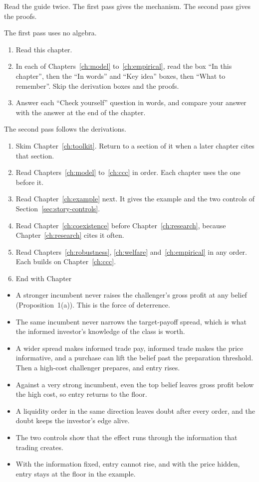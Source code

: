 Read the guide twice. The first pass gives the mechanism. The second pass gives the proofs.

The first pass uses no algebra.
\begin{enumerate}[nosep]
\item Read this chapter.
\item In each of Chapters~\ref{ch:model} to~\ref{ch:empirical}, read the box ``In this chapter'', then the ``In words'' and ``Key idea'' boxes, then ``What to remember''. Skip the derivation boxes and the proofs.
\item Answer each ``Check yourself'' question in words, and compare your answer with the answer at the end of the chapter.
\end{enumerate}

The second pass follows the derivations.
\begin{enumerate}[nosep]
\item Skim Chapter~\ref{ch:toolkit}. Return to a section of it when a later chapter cites that section.
\item Read Chapters~\ref{ch:model} to~\ref{ch:ccc} in order. Each chapter uses the one before it.
\item Read Chapter~\ref{ch:example} next. It gives the example and the two controls of Section~\ref{sec:story-controls}.
\item Read Chapter~\ref{ch:coexistence} before Chapter~\ref{ch:research}, because Chapter~\ref{ch:research} cites it often.
\item Read Chapters~\ref{ch:robustness}, \ref{ch:welfare} and~\ref{ch:empirical} in any order. Each builds on Chapter~\ref{ch:ccc}.
\item End with Chapter~\end{enumerate}

\begin{chaptersummary}
\begin{itemize}
\item A stronger incumbent never raises the challenger's gross profit at any belief (Proposition~1(a)). This is the force of deterrence.
\item The same incumbent never narrows the target-payoff spread, which is what the informed investor's knowledge of the class is worth.
\item A wider spread makes informed trade pay, informed trade makes the price informative, and a purchase can lift the belief past the preparation threshold. Then a high-cost challenger prepares, and entry rises.
\item Against a very strong incumbent, even the top belief leaves gross profit below the high cost, so entry returns to the floor.
\item A liquidity order in the same direction leaves doubt after every order, and the doubt keeps the investor's edge alive.
\item The two controls show that the effect runs through the information that trading creates.
\item With the information fixed, entry cannot rise, and with the price hidden, entry stays at the floor in the example.
\end{itemize}
\end{chaptersummary}

